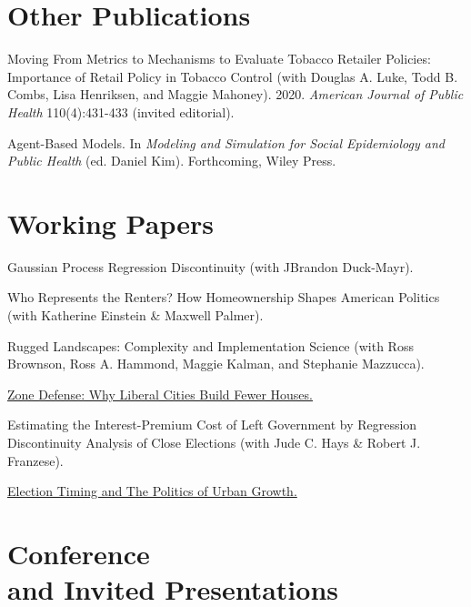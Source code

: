 \documentclass[margin,line]{res}
\newenvironment{publist}{
	\begin{list}{}{%
			\setlength{\itemsep}{0.15in}
			\setlength{\parsep}{0in} \setlength{\parskip}{0in}
			\setlength{\topsep}{0in} \setlength{\partopsep}{0in} 
			\setlength{\leftmargin}{0.15in}
			\setlength{\itemindent}{-0.15in}}}
		{\end{list}}
\begin{document}
\begin{resume}
\section{\sc Other Publications}


\begin{publist}
	\item Moving From Metrics to Mechanisms to Evaluate Tobacco Retailer Policies: Importance of Retail Policy in Tobacco Control (with Douglas A. Luke, Todd B. Combs, Lisa Henriksen, and Maggie Mahoney). 2020. \textit{American Journal of Public Health} 110(4):431-433 (invited editorial).
	\item Agent-Based Models. In \textit{Modeling and Simulation for Social Epidemiology and Public Health} (ed. Daniel Kim). Forthcoming, Wiley Press. 
\end{publist}



\section{\sc Working Papers}

\begin{publist}
	\item Gaussian Process Regression Discontinuity (with JBrandon Duck-Mayr).
	\item Who Represents the Renters? How Homeownership Shapes American Politics (with Katherine Einstein \& Maxwell Palmer). 
	\item Rugged Landscapes: Complexity and Implementation Science (with Ross Brownson, Ross A. Hammond, Maggie Kalman, and Stephanie Mazzucca).
	\item \href{https://joeornstein.github.io/publications/ornstein-zone-defense.pdf}{Zone Defense: Why Liberal Cities Build Fewer Houses.}
	\item Estimating the Interest-Premium Cost of Left Government by Regression Discontinuity Analysis of Close Elections (with Jude C. Hays \& Robert J. Franzese).
	\item \href{https://joeornstein.github.io/publications/Ornstein-ElectionTiming.pdf}{Election Timing and The Politics of Urban Growth.}
\end{publist}

\section{\sc Conference \\and Invited Presentations}


\end{resume}
\end{document}
